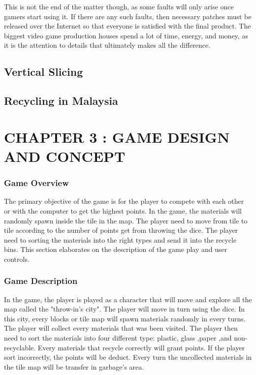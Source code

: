 \documentclass[12pt]{article}
\begin{document}
This is not the end of the matter though, as some faults will only arise once gamers start using it. If there are any such faults, then necessary patches must be released over the Internet so that everyone is satisfied with the final product. The biggest video game production houses spend a lot of time, energy, and money, as it is the attention to details that ultimately makes all the difference.

\subsection{Vertical Slicing}



\subsection{Recycling in Malaysia}


\pagebreak


\section{CHAPTER 3 : GAME DESIGN AND CONCEPT}

\subsubsection{Game Overview}
The primary objective of the game is for the player to compete with each other or with the computer to get the highest points. In the game, the materials will randomly spawn inside the tile in the map. The player need to move from tile to tile according to the number of points get from throwing the dice. The player need to sorting the materials into the right types and send it into the recycle bins. This section elaborates on the description of the game play and user controls.

\subsubsection{Game Description}
In the game, the player is played as a character that will move and explore all the map called the "throw-in's city". The player will move in turn using the dice. In this city, every blocks or tile map will spawn materials randomly in every turns. The player will collect every materials that was been visited. The player then need to sort the materials into four different type: plastic, glass ,paper ,and non-recyclable. Every materials that recycle correctly will grant points. If the player sort incorrectly, the points will be deduct. Every turn the uncollected materials in the tile map will be transfer in garbage's area. 
\end{document}
